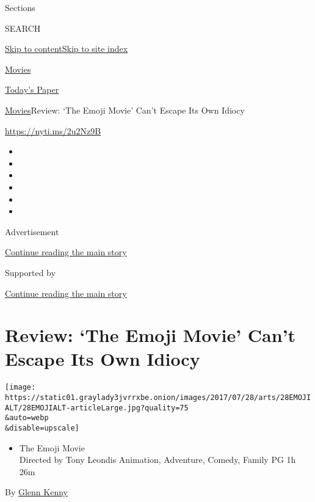 Sections

SEARCH

\protect\hyperlink{site-content}{Skip to
content}\protect\hyperlink{site-index}{Skip to site index}

\href{https://www.nytimes3xbfgragh.onion/section/movies}{Movies}

\href{https://myaccount.nytimes3xbfgragh.onion/auth/login?response_type=cookie\&client_id=vi}{}

\href{https://www.nytimes3xbfgragh.onion/section/todayspaper}{Today's
Paper}

\href{/section/movies}{Movies}\textbar{}Review: `The Emoji Movie' Can't
Escape Its Own Idiocy

\url{https://nyti.ms/2u2Nz9B}

\begin{itemize}
\item
\item
\item
\item
\item
\item
\end{itemize}

Advertisement

\protect\hyperlink{after-top}{Continue reading the main story}

Supported by

\protect\hyperlink{after-sponsor}{Continue reading the main story}

\hypertarget{review-the-emoji-movie-cant-escape-its-own-idiocy}{%
\section{Review: `The Emoji Movie' Can't Escape Its Own
Idiocy}\label{review-the-emoji-movie-cant-escape-its-own-idiocy}}

\texttt{[image: https://static01.graylady3jvrrxbe.onion/images/2017/07/28/arts/28EMOJIALT/28EMOJIALT-articleLarge.jpg?quality=75\\\&auto=webp\\\&disable=upscale]}

\begin{itemize}
\tightlist
\item
  The Emoji Movie\\
  Directed by Tony Leondis Animation, Adventure, Comedy, Family PG 1h
  26m
\end{itemize}

By \href{https://www.nytimes3xbfgragh.onion/by/glenn-kenny}{Glenn Kenny}


